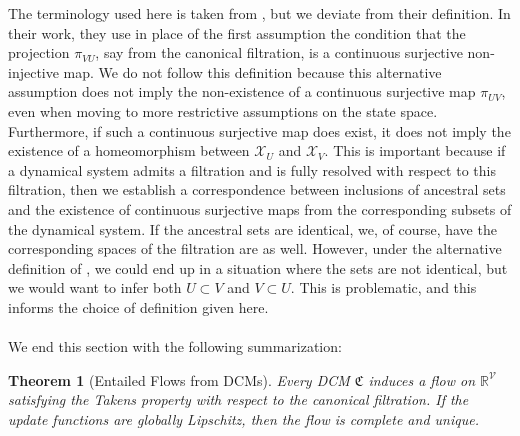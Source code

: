 \documentclass[11pt, a4paper]{memoir}
\theoremstyle{break}
\newtheorem{thm}{Theorem}
\theoremstyle{break}
\theoremstyle{nonumberplain}
\newcommand{\mR}{\mathbb{R}}
\begin{document}
The terminology used here is taken from \cite{mathFound}, but we deviate from their definition. In their work, they use in place of the first assumption the condition that the projection $\pi_{VU}$, say from the canonical filtration, is a continuous surjective non-injective map. We do not follow this definition because this alternative assumption does not imply the non-existence of a continuous surjective map $\pi_{UV}$, even when moving to more restrictive assumptions on the state space. Furthermore, if such a continuous surjective map does exist, it does not imply the existence of a homeomorphism between $\mathcal{X}_U$ and $\mathcal{X}_V$. This is important because if a dynamical system admits a filtration and is fully resolved with respect to this filtration, then we establish a correspondence between inclusions of ancestral sets and the existence of continuous surjective maps from the corresponding subsets of the dynamical system. If the ancestral sets are identical, we, of course, have the corresponding spaces of the filtration are as well. However, under the alternative definition of \cite{mathFound}, we could end up in a situation where the sets are not identical, but we would want to infer both $U\subset V$ and $V\subset U$. This is problematic, and this informs the choice of definition given here.\\\\
We end this section with the following summarization:
\begin{thm}[Entailed Flows from DCMs]
Every DCM $\mathfrak{C}$ induces a flow on $\mR^{\mathcal{V}}$ satisfying the Takens property with respect to the canonical filtration. If the update functions are globally Lipschitz, then the flow is complete and unique.
\end{thm}
\end{document}
